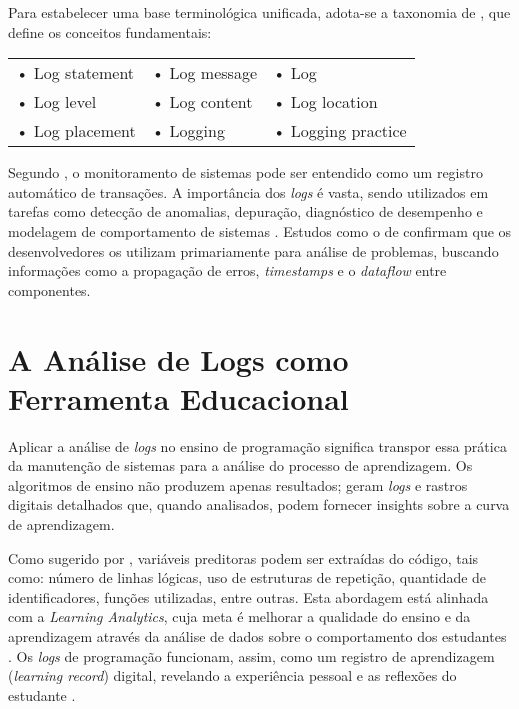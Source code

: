 Para estabelecer uma base terminológica unificada, adota-se a taxonomia de \cite{gu2022logging}, que define os conceitos fundamentais:
\begingroup
\renewcommand{\arraystretch}{1.2}
\begin{tabular}{p{}p{}p{}}
    • Log statement       & • Log message     & • Log \\
    • Log level           & • Log content     & • Log location \\
    • Log placement       & • Logging         & • Logging practice \\
\end{tabular}
\endgroup
\vspace{2em}

Segundo \cite{rice1983use}, o monitoramento de sistemas pode ser entendido como um registro automático de transações. A importância dos \textit{logs} é vasta, sendo utilizados em tarefas como detecção de anomalias, depuração, diagnóstico de desempenho e modelagem de comportamento de sistemas \cite{fu_where_2014}. Estudos como o de \cite{yang2021interview} confirmam que os desenvolvedores os utilizam primariamente para análise de problemas, buscando informações como a propagação de erros, \textit{timestamps} e o \textit{dataflow} entre componentes.

\section{A Análise de Logs como Ferramenta Educacional}
\label{sec:logs-educacionais}

Aplicar a análise de \textit{logs} no ensino de programação significa transpor essa prática da manutenção de sistemas para a análise do processo de aprendizagem. Os algoritmos de ensino não produzem apenas resultados; geram \textit{logs} e rastros digitais detalhados que, quando analisados, podem fornecer insights sobre a curva de aprendizagem.

Como sugerido por \cite{silva2022previsao}, variáveis preditoras podem ser extraídas do código, tais como: número de linhas lógicas, uso de estruturas de repetição, quantidade de identificadores, funções utilizadas, entre outras. Esta abordagem está alinhada com a \textit{Learning Analytics}, cuja meta é melhorar a qualidade do ensino e da aprendizagem através da análise de dados sobre o comportamento dos estudantes \cite{huang2020predicting}. Os \textit{logs} de programação funcionam, assim, como um registro de aprendizagem (\textit{learning record}) digital, revelando a experiência pessoal e as reflexões do estudante \cite{du2005learning}.


